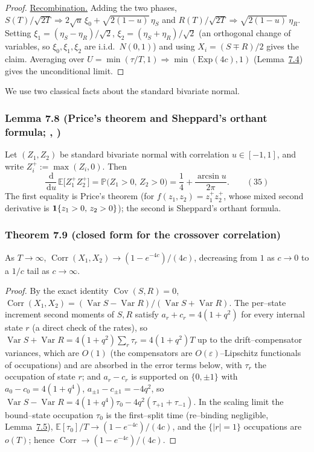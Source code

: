 \documentclass[11pt]{article}
\theoremstyle{plain}
\theoremstyle{definition}
\theoremstyle{remark}
\DeclareMathOperator{\Var}{Var}\DeclareMathOperator{\Cov}{Cov}
\DeclareMathOperator{\Corr}{Corr}\DeclareMathOperator{\cum}{cum}
\newcommand{\E}{\mathbb{E}}\newcommand{\PP}{\mathbb{P}}\newcommand{\dd}{\,\mathrm{d}}
\newcommand{\To}{\Rightarrow}\newcommand{\so}{\mathfrak{so}}
\newcommand{\eps}{\varepsilon}\newcommand{\Exp}{\mathrm{Exp}}
\begin{document}
\begin{proof}
\underline{Recombination.} Adding the two phases,
$S(T)/\sqrt{2T}\To2\sqrt u\,\xi_0+\sqrt{2(1-u)}\,\eta_S$ and
$R(T)/\sqrt{2T}\To\sqrt{2(1-u)}\,\eta_R$. Setting $\xi_1=(\eta_S-\eta_R)/\sqrt2$,
$\xi_2=(\eta_S+\eta_R)/\sqrt2$ (an orthogonal change of variables, so $\xi_0,\xi_1,\xi_2$
are i.i.d.\ $N(0,1)$) and using $X_i=(S\mp R)/2$ gives the claim. Averaging over
$U=\min(\tau/T,1)\To\min(\Exp(4c),1)$ (Lemma~\hyperref[lem_split]{7.4}) gives the unconditional limit.
\end{proof}

We use two classical facts about the standard bivariate normal.

\subsubsection{Lemma 7.8 (Price's theorem and Sheppard's orthant formula; {\cite{Price}}, {\cite{Sheppard}})}\label{lem_price}

Let $(Z_1,Z_2)$ be standard bivariate normal with correlation $u\in[-1,1]$, and write
$Z_i^+:=\max(Z_i,0)$. Then
\label{eq_price}
\begin{equation}
  \frac{\dd}{\dd u}\,\E\big[Z_1^+Z_2^+\big]=\PP\big(Z_1>0,\,Z_2>0\big)
  =\frac14+\frac{\arcsin u}{2\pi}.\qquad(35)
\end{equation}
The first equality is Price's theorem (for $f(z_1,z_2)=z_1^+z_2^+$, whose mixed second
derivative is $\mathbf 1\{z_1>0,\,z_2>0\}$); the second is Sheppard's orthant formula.
\par

\subsubsection{Theorem 7.9 (closed form for the crossover correlation)}\label{thm_closed}

As $T\to\infty$, $\Corr(X_1,X_2)\to(1-e^{-4c})/(4c)$, decreasing from $1$ as $c\to0$ to a
$1/c$ tail as $c\to\infty$.
\par
\begin{proof}
By the exact identity $\Cov(S,R)=0$,
$\Corr(X_1,X_2)=(\Var S-\Var R)/(\Var S+\Var R)$. The per--state increment second
moments of $S,R$ satisfy $a_r+c_r=4(1+q^2)$ for every internal state $r$ (a direct
check of the rates), so $\Var S+\Var R=4(1+q^2)\sum_r\tau_r=4(1+q^2)T$ up to the
drift--compensator variances, which are $O(1)$ (the compensators are
$O(\eps)$--Lipschitz functionals of occupations) and are absorbed in the error terms
below, with $\tau_r$ the occupation of state $r$; and $a_r-c_r$ is supported on $\{0,\pm1\}$ with
$a_0-c_0=4(1+q^4)$, $a_{\pm1}-c_{\pm1}=-4q^2$, so
$\Var S-\Var R=4(1+q^4)\tau_0-4q^2(\tau_{+1}+\tau_{-1})$. In the scaling limit the
bound--state occupation $\tau_0$ is the first--split time (re--binding negligible,
Lemma~\hyperref[lem_rebind]{7.5}), $\E[\tau_0]/T\to(1-e^{-4c})/(4c)$, and the $\{|r|=1\}$
occupations are $o(T)$; hence $\Corr\to(1-e^{-4c})/(4c)$.
\end{proof}
\end{document}
